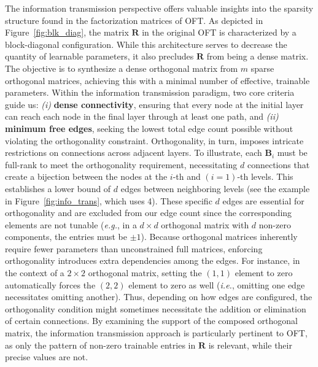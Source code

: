 The information transmission perspective offers valuable insights into the sparsity structure found in the factorization matrices of OFT. As depicted in Figure~\ref{fig:blk_diag}, the matrix $\bm{R}$ in the original OFT is characterized by a block-diagonal configuration. While this architecture serves to decrease the quantity of learnable parameters, it also precludes $\bm{R}$ from being a dense matrix. The objective is to synthesize a dense orthogonal matrix from $m$ sparse orthogonal matrices, achieving this with a minimal number of effective, trainable parameters. Within the information transmission paradigm, two core criteria guide us: \emph{(i)} \textbf{dense connectivity}, ensuring that every node at the initial layer can reach each node in the final layer through at least one path, and \emph{(ii)} \textbf{minimum free edges}, seeking the lowest total edge count possible without violating the orthogonality constraint. Orthogonality, in turn, imposes intricate restrictions on connections across adjacent layers. To illustrate, each $\bm{B}_i$ must be full-rank to meet the orthogonality requirement, necessitating $d$ connections that create a bijection between the nodes at the $i$-th and $(i=1)$-th levels. This establishes a lower bound of $d$ edges between neighboring levels (see the example in Figure~\ref{fig:info_trans}, which uses 4). These specific $d$ edges are essential for orthogonality and are excluded from our edge count since the corresponding elements are not tunable (\emph{e.g.}, in a $d\times d$ orthogonal matrix with $d$ non-zero components, the entries must be $\pm 1$). Because orthogonal matrices inherently require fewer parameters than unconstrained full matrices, enforcing orthogonality introduces extra dependencies among the edges. For instance, in the context of a $2\times 2$ orthogonal matrix, setting the $(1,1)$ element to zero automatically forces the $(2,2)$ element to zero as well (\emph{i.e.}, omitting one edge necessitates omitting another). Thus, depending on how edges are configured, the orthogonality condition might sometimes necessitate the addition or elimination of certain connections. By examining the support of the composed orthogonal matrix, the information transmission approach is particularly pertinent to OFT, as only the pattern of non-zero trainable entries in $\bm{R}$ is relevant, while their precise values are not.

